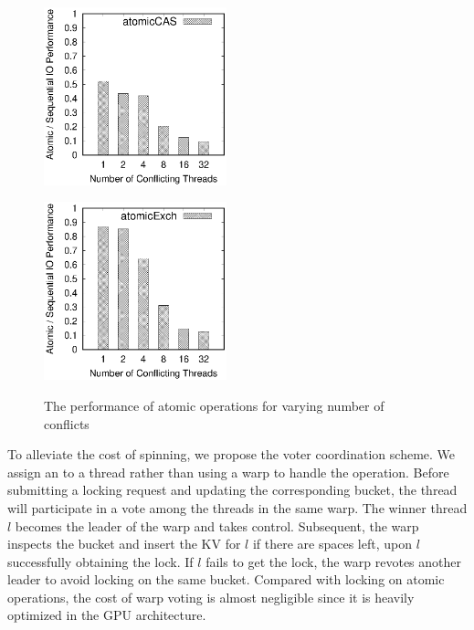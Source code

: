 \begin{figure}[t]
	\hspace{-3em}
	\begin{minipage}{0.5\linewidth}
		\label{fig:atomicCAS}
		\includegraphics[width=5.3cm]{exp/atomic/atomicCAS.eps}
	\end{minipage}
	\hspace{-1em}
	\begin{minipage}{0.5\linewidth}
		\label{fig:atomicExch}
		\includegraphics[width=5.3cm]{exp/atomic/atomicExch.eps}
	\end{minipage}
	\caption{The performance of atomic operations for varying number of conflicts}
	\label{fig:atomic}
\end{figure}

To alleviate the cost of spinning, we propose the voter coordination scheme. 
We assign an  to a thread rather than using a warp to handle the operation. Before submitting a locking request and updating the corresponding bucket, the thread will participate in a vote among the threads in the same warp. 
The winner thread $l$ becomes the leader of the warp and takes control. Subsequent, the warp inspects the bucket and insert the KV for $l$ if there are spaces left, upon $l$ successfully obtaining the lock.
If $l$ fails to get the lock, the warp revotes another leader to avoid locking on the same bucket.
Compared with locking on atomic operations, the cost of warp voting is almost negligible since it is heavily optimized in the GPU architecture.  



